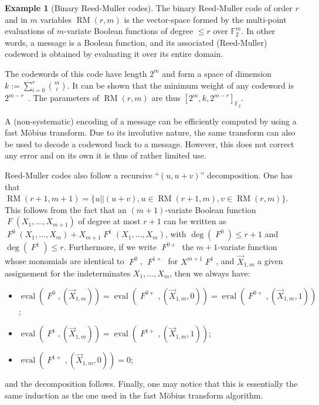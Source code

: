 \documentclass[11pt,a4paper]{article}
\theoremstyle{definition}
\newtheorem{example}{Example}
\DeclareMathOperator\RM{\mathrm{RM}}
\DeclareMathOperator\fun{\mathit{F}}
\DeclareMathOperator\eval{eval}
\newcommand\ftwo{\mathbb{F}_{2}}
\begin{document}
\begin{example}[Binary Reed-Muller codes]
	The binary Reed-Muller code of order $r$ and in $m$ variables $\RM(r,m)$ is the vector-space formed by the multi-point evaluations of $m$-variate Boolean functions of degree $\leq r$ over $\ftwo^m$. In other words,
	a message is a Boolean function, and its associated (Reed-Muller) codeword is obtained by evaluating it over its entire domain.
	
	The codewords of this code have length $2^m$ and form a space of dimension $k := \sum_{i=0}^r\binom{m}{i}$.
	It can be shown that the minimum weight of any codeword is $2^{m-r}$~\cite[Ch. 13, Thm. 3]{MS}. The parameters of $\RM(r,m)$ are thus $[2^m, k, 2^{m-r}]_{\ftwo}$.

	A (non-systematic) encoding of a message can be efficiently computed by using a fast Möbius transform. Due to its involutive nature, the same transform can also be used to decode a codeword back to a message. However, this does not correct any
	error and on its own it is thus of rather limited use.

	Reed-Muller codes also follow a recursive ``$(u,u+v)$'' decomposition. One has that $\RM(r+1,m+1) = \{u||(u+v), u \in \RM(r+1,m), v \in \RM(r,m)\}$. This follows from the fact that an $(m+1)$-variate Boolean function $\fun(X_1,\ldots,X_{m+1})$
	of degree at most $r+1$ can be written as $\fun^{0}(X_1,\ldots,X_m) + X_{m+1}\fun^{1}(X_1,\ldots,X_m)$, with
	$\deg(\fun^0) \leq r+1$ and $\deg(\fun^1) \leq r$. Furthermore, if we write $\fun^{0+}$ the $m+1$-variate function whose monomials are identical
	to $\fun^0$, $\fun^{1+}$ for %
	$X^{m+1}\fun^{1}$,
	and $\vec{X}_{1,m}$ a given assignement for the indeterminates $X_1,\ldots,X_m$, 
	then 
	we always have:
	\begin{itemize}
		\item $\eval(\fun^0,(\vec{X}_{1,m})) = \eval(\fun^{0+},(\vec{X}_{1,m},0)) = \eval(\fun^{0+},(\vec{X}_{1,m},1))$;
		\item $\eval(\fun^1,(\vec{X}_{1,m})) = \eval(\fun^{1+},(\vec{X}_{1,m},1))$;
		\item $\eval(\fun^{1+},(\vec{X}_{1,m},0)) = 0$;
	\end{itemize}
	and the decomposition follows. Finally, one may notice that this is essentially the same induction as the one used in the fast
	Möbius transform algorithm.
\end{example}
\end{document}
